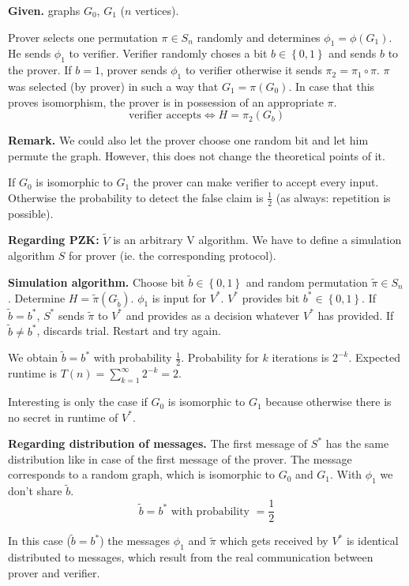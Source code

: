 \documentclass[a4paper]{article}
\newcommand{\set}[1]{\left\{#1\right\}}
\begin{document}
\textbf{Given.} graphs $G_0$, $G_1$ ($n$ vertices).

Prover selects one permutation $\pi \in S_n$ randomly and determines
$\phi_1 = \phi(G_1)$. He sends $\phi_1$ to verifier. Verifier
randomly choses a bit $b \in \set{0,1}$ and sends $b$ to the prover.
If $b=1$, prover sends $\phi_1$ to verifier otherwise it sends
$\pi_2 = \pi_1 \circ \pi$. $\pi$ was selected (by prover) in such a way
that $G_1 = \pi(G_0)$. In case that this proves isomorphism,
the prover is in possession of an appropriate $\pi$.
\[
  \text{verifier accepts} \Leftrightarrow H = \pi_2(G_b)
\]

\textbf{Remark.} We could also let the prover choose one random bit
and let him permute the graph. However, this does not change the theoretical
points of it.

If $G_0$ is isomorphic to $G_1$ the prover can make verifier to accept
every input. Otherwise the probability to detect the false claim is
$\frac12$ (as always: repetition is possible).

\textbf{Regarding PZK:}
  $\tilde{V}$ is an arbitrary V algorithm. We have to define a simulation
  algorithm $S$ for prover (ie. the corresponding protocol).

\textbf{Simulation algorithm.}
Choose bit $\tilde{b} \in \set{0,1}$ and random permutation $\tilde{\pi} \in S_n$.
Determine $H = \tilde{\pi}(G_{\tilde{b}})$. $\phi_1$ is input for $V^*$. $V^*$
provides bit $b^* \in \set{0,1}$. If $\tilde{b} = b^*$, $S^*$ sends $\tilde{\pi}$
to $V^*$ and provides as a decision whatever $V^*$ has provided.
If $\tilde{b} \neq b^*$, discards trial. Restart and try again.

We obtain $\tilde{b} = b^*$ with probability $\frac12$.
Probability for $k$ iterations is $2^{-k}$. Expected runtime is
$T(n) = \sum_{k=1}^\infty 2^{-k} = 2$.

Interesting is only the case if $G_0$ is isomorphic to $G_1$
because otherwise there is no secret in runtime of $V^*$.

\textbf{Regarding distribution of messages.}
The first message of $S^*$ has the same distribution like in case of the
first message of the prover. The message corresponds to a random graph,
which is isomorphic to $G_0$ and $G_1$. With $\phi_1$ we don't share $\tilde{b}$.
\[
  \tilde{b} = b^* \text{ with probability } = \frac12
\]

In this case ($\tilde{b} = b^*$) the messages $\phi_1$ and $\tilde{\pi}$ which
gets received by $V^*$ is identical distributed to messages, which result from
the real communication between prover and verifier.
\end{document}
